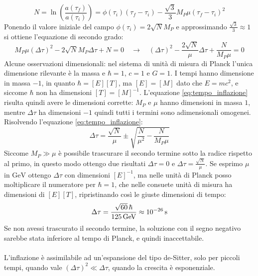 \documentclass[]{scrartcl}
\newcommand{\me}{\mathrm{e}}
\begin{document}
\[
  N = \ln \left( \frac{a(\tau_f)}{a(\tau_i)} \right) =  \phi(\tau_i) (\tau_f - \tau_i)- \frac{\sqrt{3}}{3} M_P \mu (\tau_f - \tau_i)^2
\]
Ponendo il valore iniziale del campo $ \phi(\tau_i) = 2 \sqrt{N} M_P $ e approssimando $ \frac{\sqrt{3}}{3} \approx 1 $
si ottiene l'equazione di secondo grado:
\begin{equation}
  \label{eq:tempo_inflazione}
  M_P \mu \left( \Delta \tau \right)^2 - 2 \sqrt{N} M_P \Delta \tau + N = 0 \quad
  \rightarrow \quad
  \left( \Delta \tau \right)^2 - \frac{2 \sqrt{N}}{\mu} \Delta \tau + \frac{N}{M_P \mu} = 0
\end{equation}
Alcune osservazioni dimensionali: nel sistema di unità di misura di Planck l'unica dimensione rilevante è la massa e $ \hbar = 1 $, $ c = 1 $
e $ G = 1 $. I tempi hanno dimensione in massa $ -1 $, in quanto $ \hbar = [E][T] $, ma $ [E] = [M] $ dato che $ E = mc^2 $, e siccome $ \hbar $
non ha dimensioni $ [T] = [M]^{-1} $. L'equazione \eqref{eq:tempo_inflazione} risulta quindi avere le dimensioni corrette: $ M_P $ e $ \mu $ hanno
dimensioni in massa $ 1 $, mentre $ \Delta \tau $ ha dimensioni $ -1 $ quindi tutti i termini sono adimensionali omogenei.
Risolvendo l'equazione \eqref{eq:tempo_inflazione}:
\[
  \Delta \tau = \frac{\sqrt{N}}{\mu} \pm \sqrt{\frac{N}{\mu^2} - \frac{N}{M_P\mu}}
\]
Siccome $ M_P \gg \mu $ è possibile trascurare il secondo termine sotto la radice rispetto al primo, in questo modo ottengo due risultati
$ \Delta \tau = 0 $ e $ \Delta \tau = \frac{\sqrt{N}}{\mu} $.
Se esprimo $ \mu $ in $ \si{\GeV} $ ottengo $ \Delta \tau $ con dimensioni $ [E]^{-1} $, ma nelle unità di Planck posso moltiplicare il numeratore
per $ \hbar = 1 $, che nelle consuete unità di misura ha dimensioni di $ [E][T] $, ripristinando così le giuste dimensioni di tempo:
\[
  \Delta \tau = \frac{\sqrt{60}\,\hbar}{\SI{125}{\GeV}}\approx \SI{E-26}{\second}
\]
Se non avessi trascurato il secondo termine, la soluzione con il segno negativo sarebbe stata inferiore al tempo di Planck, e quindi inaccettabile.
\\ \\
L'inflazione è assimilabile ad un'espansione del tipo de-Sitter, solo per piccoli tempi, quando vale $ \left( \Delta \tau \right)^2
\ll \Delta \tau $, quando la crescita è esponenziale. %
\end{document}
